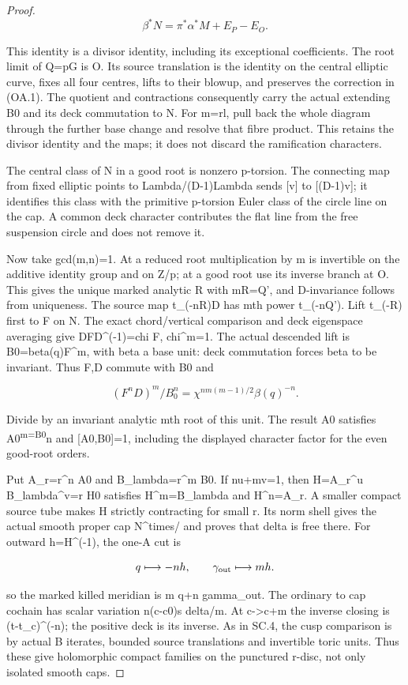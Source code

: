 \begin{proof}
\[
\beta^*N=\pi^*\alpha^*M+E_P-E_O.\tag{OA.1}
\]

This identity is a divisor identity, including its exceptional
coefficients. The root limit of Q=pG is O. Its source translation
is the identity on the central elliptic curve, fixes all four
centres, lifts to their blowup, and preserves the correction in
(OA.1). The quotient and contractions consequently carry the
actual extending B0 and its deck commutation to N. For m=rl,
pull back the whole diagram through the further base change
and resolve that fibre product. This retains the divisor identity
and the maps; it does not discard the ramification characters.

The central class of N in a good root is nonzero p-torsion.
The connecting map from fixed elliptic points to
Lambda/(D-1)Lambda sends {[}v{]} to {[}(D-1)v{]}; it identifies this
class with the primitive p-torsion Euler class of the circle
line on the cap. A common deck character contributes the flat
line from the free suspension circle and does not remove it.

Now take gcd(m,n)=1. At a reduced root multiplication by m
is invertible on the additive identity group and on Z/p; at
a good root use its inverse branch at O. This gives the unique
marked analytic R with mR=Q', and D-invariance follows from
uniqueness. The source map t\_(-nR)D has mth power t\_(-nQ').
Lift t\_(-R) first to F on N. The exact chord/vertical comparison
and deck eigenspace averaging give DFD\^{}(-1)=chi F, chi\^{}m=1.
The actual descended lift is B0=beta(q)F\^{}m, with beta a base
unit: deck commutation forces beta to be invariant. Thus F,D
commute with B0 and

\[
(F^nD)^m/B_0^n=\chi^{nm(m-1)/2}\beta(q)^{-n}.
\]

Divide by an invariant analytic mth root of this unit. The
result A0 satisfies A0\textsuperscript{m=B0}n and {[}A0,B0{]}=1, including the
displayed character factor for the even good-root orders.

Put A\_r=r\^{}n A0 and B\_lambda=r\^{}m B0. If nu+mv=1, then
H=A\_r\^{}u B\_lambda\^{}v=r H0 satisfies H\^{}m=B\_lambda and H\^{}n=A\_r.
A smaller compact source tube makes H strictly contracting for
small \textbar r\textbar. Its norm shell gives the actual smooth proper cap
N\^{}times/ and proves that delta is free there. For outward
h=H\^{}(-1), the one-A cut is

\[
q\longmapsto-nh,\qquad\gamma_{\rm out}\longmapsto mh.
\]

so the marked killed meridian is m q+n gamma\_out. The ordinary
to cap cochain has scalar variation n(c-c0)s delta/m. At
c-\textgreater c+m the inverse closing is (t-t\_c)\^{}(-n); the positive
deck is its inverse. As in SC.4, the cusp comparison is by
actual B iterates, bounded source translations and invertible
toric units. Thus these give holomorphic compact families on
the punctured r-disc, not only isolated smooth caps.


\end{proof}
